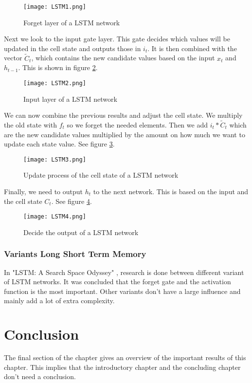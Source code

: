 \begin{figure}[H]
	\centering
	\texttt{[image: LSTM1.png]}
	\caption{Forget layer of a LSTM network \cite{lstmGood:online}}
	\label{fig:LSTM1}
\end{figure} 

Next we look to the input gate layer. This gate decides which values will be updated in the cell state and outputs those in $i_t$. It is then combined with the vector $\widetilde{C}_t$, which contains the new candidate values based on the input $x_t$ and $h_{t-1}$. This is shown in figure \ref{fig:LSTM2}.

\begin{figure}[H]
	\centering
	\texttt{[image: LSTM2.png]}
	\caption{Input layer of a LSTM network \cite{lstmGood:online}}
	\label{fig:LSTM2}
\end{figure} 

We can now combine the previous results and adjust the cell state. We multiply the old state with $f_t$ so we forget the needed elements. Then we add $i_t*\widetilde{C}_t$ which are the new candidate values multiplied by the amount on how much we want to update each state value. See figure \ref{fig:LSTM3}.

\begin{figure}[H]
	\centering
	\texttt{[image: LSTM3.png]}
	\caption{Update process of the cell state of a LSTM network \cite{lstmGood:online}}
	\label{fig:LSTM3}
\end{figure} 

Finally, we need to output $h_t$ to the next network. This is based on the input and the cell state $C_t$. See figure \ref{fig:LSTM4}.

\begin{figure}[H]
	\centering
	\texttt{[image: LSTM4.png]}
	\caption{Decide the output of a LSTM network \cite{lstmGood:online}}
	\label{fig:LSTM4}
\end{figure} 


\subsubsection{Variants Long Short Term Memory}

In "LSTM: A Search Space Odyssey" \cite{lstmSpace:article}, research is done between different variant of LSTM networks. It was concluded that the forget gate and the activation function is the most important. Other variants don't have a large influence and mainly add a lot of extra complexity.


\section{Conclusion}
The final section of the chapter gives an overview of the important results
of this chapter. This implies that the introductory chapter and the
concluding chapter don't need a conclusion.



